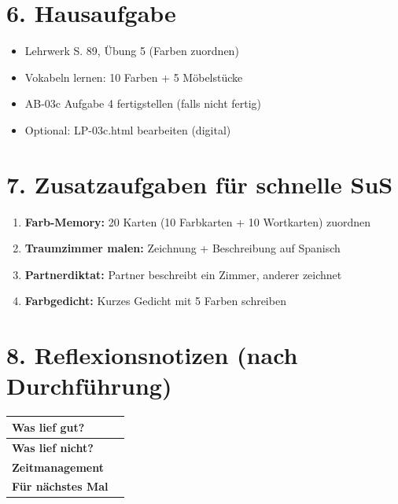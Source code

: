 \documentclass[11pt, a4paper]{article}
\begin{document}

\section*{6. Hausaufgabe}

\begin{itemize}
    \item Lehrwerk S. 89, Übung 5 (Farben zuordnen)
    \item Vokabeln lernen: 10 Farben + 5 Möbelstücke
    \item AB-03c Aufgabe 4 fertigstellen (falls nicht fertig)
    \item Optional: LP-03c.html bearbeiten (digital)
\end{itemize}


\section*{7. Zusatzaufgaben für schnelle SuS}

\begin{enumerate}
    \item \textbf{Farb-Memory:} 20 Karten (10 Farbkarten + 10 Wortkarten) zuordnen
    \item \textbf{Traumzimmer malen:} Zeichnung + Beschreibung auf Spanisch
    \item \textbf{Partnerdiktat:} Partner beschreibt ein Zimmer, anderer zeichnet
    \item \textbf{Farbgedicht:} Kurzes Gedicht mit 5 Farben schreiben
\end{enumerate}


\section*{8. Reflexionsnotizen (nach Durchführung)}

\begin{tabularx}{\textwidth}{|l|X|}
\hline
\textbf{Was lief gut?} & \\[2em]
\hline
\textbf{Was lief nicht?} & \\[2em]
\hline
\textbf{Zeitmanagement} & \\[2em]
\hline
\textbf{Für nächstes Mal} & \\[2em]
\hline
\end{tabularx}
\end{document}
